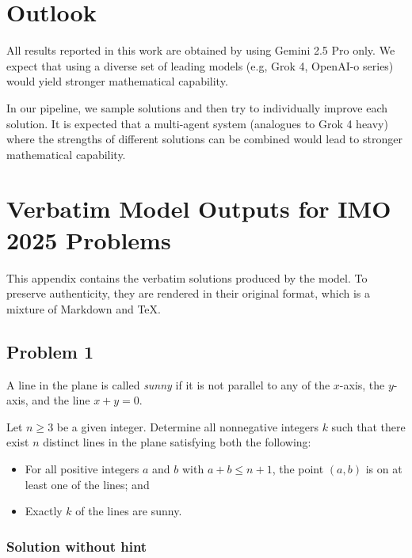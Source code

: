 \section{Outlook}

All results reported in this work are obtained by using Gemini 2.5 Pro only. We expect that using a diverse set of leading models (e.g, Grok 4, OpenAI-o series) would yield stronger mathematical capability.

In our pipeline, we sample solutions and then try to individually improve each solution. It is expected that a multi-agent system (analogues to Grok 4 heavy) where the strengths of different solutions can be combined would lead to stronger mathematical capability.




\appendix

\section{Verbatim Model Outputs for IMO 2025 Problems} \label{app}

This appendix contains the verbatim solutions produced by the model. To preserve authenticity, they are rendered in their original format, which is a mixture of Markdown and TeX.

\subsection{Problem 1}

\begin{problem}
A line in the plane is called \textit{sunny} if it is not parallel to any of the $x$-axis, the $y$-axis, and the line $x+y=0$.

Let $n \ge 3$ be a given integer. Determine all nonnegative integers $k$ such that there exist $n$ distinct lines in the plane satisfying both the following:
\begin{itemize}
    \item For all positive integers $a$ and $b$ with $a + b \le n + 1$, the point $(a,b)$ is on at least one of the lines; and
    \item Exactly $k$ of the lines are sunny.
\end{itemize}
\end{problem}

\subsubsection{Solution without hint}

